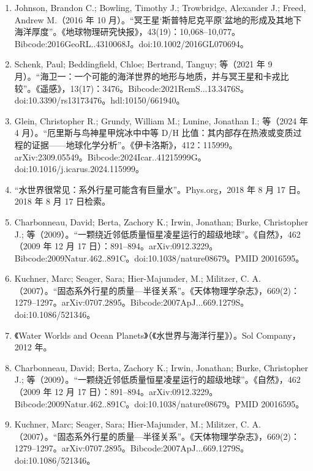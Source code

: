 \begin{enumerate}
\item Johnson, Brandon C.; Bowling, Timothy J.; Trowbridge, Alexander J.; Freed, Andrew M.（2016 年 10 月）。“冥王星‘斯普特尼克平原’盆地的形成及其地下海洋厚度”。《地球物理研究快报》，43(19)：10,068–10,077。Bibcode:2016GeoRL..4310068J。doi:10.1002/2016GL070694。

\item Schenk, Paul; Beddingfield, Chloe; Bertrand, Tanguy; 等（2021 年 9 月）。“海卫一：一个可能的海洋世界的地形与地质，并与冥王星和卡戎比较”。《遥感》，13(17)：3476。Bibcode:2021RemS...13.3476S。doi:10.3390/rs13173476。hdl:10150/661940。

\item Glein, Christopher R.; Grundy, William M.; Lunine, Jonathan I.; 等（2024 年 4 月）。“厄里斯与鸟神星甲烷冰中中等 D/H 比值：其内部存在热液或变质过程的证据——地球化学分析”。《伊卡洛斯》，412：115999。arXiv:2309.05549。Bibcode:2024Icar..41215999G。doi:10.1016/j.icarus.2024.115999。

\item “水世界很常见：系外行星可能含有巨量水”。Phys.org，2018 年 8 月 17 日。2018 年 8 月 17 日检索。

\item Charbonneau, David; Berta, Zachory K.; Irwin, Jonathan; Burke, Christopher J.; 等（2009）。“一颗绕近邻低质量恒星凌星运行的超级地球”。《自然》，462（2009 年 12 月 17 日）：891–894。arXiv:0912.3229。Bibcode:2009Natur.462..891C。doi:10.1038/nature08679。PMID 20016595。

\item Kuchner, Marc; Seager, Sara; Hier-Majumder, M.; Militzer, C. A.（2007）。“固态系外行星的质量—半径关系”。《天体物理学杂志》，669(2)：1279–1297。arXiv:0707.2895。Bibcode:2007ApJ...669.1279S。doi:10.1086/521346。

\item 《Water Worlds and Ocean Planets》（《水世界与海洋行星》）。Sol Company，2012 年。

\item Charbonneau, David; Berta, Zachory K.; Irwin, Jonathan; Burke, Christopher J.; 等（2009）。“一颗绕近邻低质量恒星凌星运行的超级地球”。《自然》，462（2009 年 12 月 17 日）：891–894。arXiv:0912.3229。Bibcode:2009Natur.462..891C。doi:10.1038/nature08679。PMID 20016595。

\item Kuchner, Marc; Seager, Sara; Hier-Majumder, M.; Militzer, C. A.（2007）。“固态系外行星的质量—半径关系”。《天体物理学杂志》，669(2)：1279–1297。arXiv:0707.2895。Bibcode:2007ApJ...669.1279S。doi:10.1086/521346。

\end{enumerate}